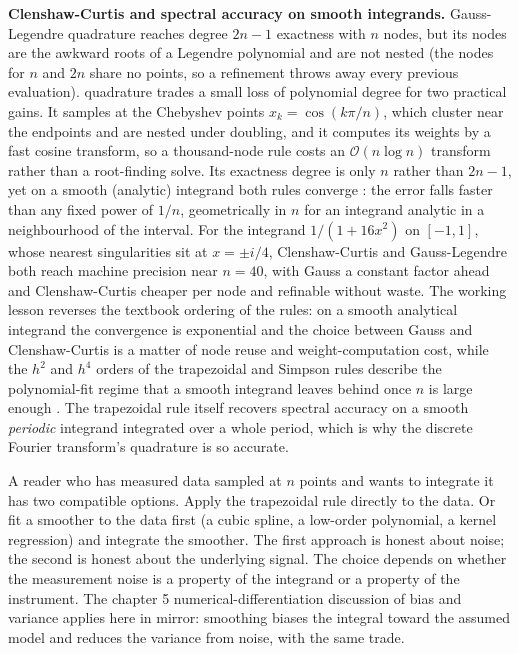 \begin{mastery}
\textbf{Clenshaw-Curtis and spectral accuracy on smooth integrands.}
Gauss-Legendre quadrature reaches degree $2n - 1$ exactness with $n$
nodes, but its nodes are the awkward roots of a Legendre polynomial
and are not nested (the nodes for $n$ and $2n$ share no points, so a
refinement throws away every previous evaluation).  quadrature trades a small loss of polynomial degree for two
practical gains. It samples at the Chebyshev points $x_{k} =
\cos(k\pi/n)$, which cluster near the endpoints and are nested under
doubling, and it computes its weights by a fast cosine transform, so a
thousand-node rule costs an $\mathcal{O}(n\log n)$ transform rather
than a root-finding solve. Its exactness degree is only $n$ rather
than $2n - 1$, yet on a smooth (analytic) integrand both rules
converge : the error falls faster than any fixed
power of $1/n$, geometrically in $n$ for an integrand analytic in a
neighbourhood of the interval. For the integrand $1/(1 + 16x^{2})$ on
$[-1, 1]$, whose nearest singularities sit at $x = \pm i/4$,
Clenshaw-Curtis and Gauss-Legendre both reach machine precision near
$n = 40$, with Gauss a constant factor ahead and Clenshaw-Curtis
cheaper per node and refinable without waste. The working lesson
reverses the textbook ordering of the rules: on a smooth analytical
integrand the convergence is exponential and the choice between Gauss
and Clenshaw-Curtis is a matter of node reuse and weight-computation
cost, while the $h^{2}$ and $h^{4}$ orders of the trapezoidal and
Simpson rules describe the polynomial-fit regime that a smooth
integrand leaves behind once $n$ is large enough
\cite{paper:v2ch06-trefethen-quadrature-2008}. The trapezoidal rule
itself recovers spectral accuracy on a smooth \emph{periodic}
integrand integrated over a whole period, which is why the discrete
Fourier transform's quadrature is so accurate.
\end{mastery}

A reader who has measured data sampled at $n$ points and wants to
integrate it has two compatible options. Apply the trapezoidal rule
directly to the data. Or fit a smoother to the data first (a cubic
spline, a low-order polynomial, a kernel regression) and integrate
the smoother. The first approach is honest about noise; the second
is honest about the underlying signal. The choice depends on
whether the measurement noise is a property of the integrand or a
property of the instrument. The chapter 5 numerical-differentiation
discussion of bias and variance applies here in mirror: smoothing
biases the integral toward the assumed model and reduces the
variance from noise, with the same trade.

